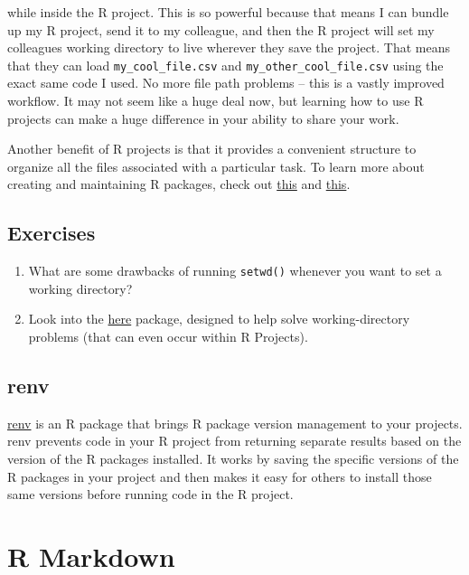 \documentclass[
]{book}
\begin{document}
while inside the R project. This is so powerful because that means I can bundle up my R project, send it to my colleague, and then the R project will set my colleagues working directory to live wherever they save the project. That means that they can load \texttt{my\_cool\_file.csv} and \texttt{my\_other\_cool\_file.csv} using the exact same code I used. No more file path problems -- this is a vastly improved workflow. It may not seem like a huge deal now, but learning how to use R projects can make a huge difference in your ability to share your work.

Another benefit of R projects is that it provides a convenient structure to organize all the files associated with a particular task. To learn more about creating and maintaining R packages, check out \href{https://r4ds.had.co.nz/workflow-projects.html}{this} and \href{https://support.rstudio.com/hc/en-us/articles/200526207-Using-Projects}{this}.

\hypertarget{exercises-9}{%
\subsection{Exercises}\label{exercises-9}}

\begin{enumerate}
\def\labelenumi{\arabic{enumi}.}
\item
  What are some drawbacks of running \texttt{setwd()} whenever you want to set a working directory?
\item
  Look into the \href{https://here.r-lib.org/}{here} package, designed to help solve working-directory problems (that can even occur within R Projects).
\end{enumerate}

\hypertarget{renv}{%
\subsection{renv}\label{renv}}

\href{https://rstudio.github.io/renv/articles/renv.html}{renv} is an R package that brings R package version management to your projects. renv prevents code in your R project from returning separate results based on the version of the R packages installed. It works by saving the specific versions of the R packages in your project and then makes it easy for others to install those same versions before running code in the R project.

\hypertarget{r-markdown}{%
\section{R Markdown}\label{r-markdown}}
\end{document}

